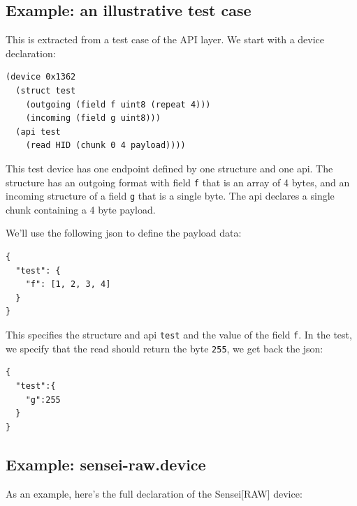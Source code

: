 \documentclass[12pt]{article}
\begin{document}
\subsection{Example: an illustrative test case}

This is extracted from a test case of the API layer.  We start with a device declaration:

\begin{verbatim}
(device 0x1362
  (struct test 
    (outgoing (field f uint8 (repeat 4)))
    (incoming (field g uint8)))
  (api test
    (read HID (chunk 0 4 payload))))
\end{verbatim}

This test device has one endpoint defined by one structure and one
api. The structure has an outgoing format with field \verb|f| that is
an array of 4 bytes, and an incoming structure of a field \verb|g|
that is a single byte. The api declares a single chunk containing a 4
byte payload.

We'll use the following json to define the payload data:

\begin{verbatim}
{
  "test": {
    "f": [1, 2, 3, 4]
  }
}
\end{verbatim}

This specifies the structure and api \verb|test| and the value of the
field \verb|f|. In the test, we specify that the read should return
the byte \verb|255|, we get back the json:

\begin{verbatim}
{
  "test":{
    "g":255
  }
}
\end{verbatim}

\subsection{Example: sensei-raw.device}

As an example, here's the full declaration of the Sensei[RAW] device:
\end{document}
